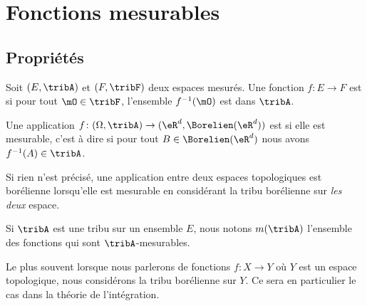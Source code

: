 
\section{Fonctions mesurables}

\subsection{Propriétés}

\begin{definition} \label{DefQKjDSeC}
    Soit \( (E,\tribA)\) et \( (F,\tribF)\) deux espaces mesurés. Une fonction \( f\colon E\to F\) est  si pour tout \( \mO\in \tribF\), l'ensemble \( f^{-1}(\mO)\) est dans \( \tribA\).
\end{definition}

\begin{definition}     \label{DefHHIBooNrpQjs}
    Une application \( f\colon (\Omega,\tribA)\to (\eR^d,\Borelien(\eR^d))\) est  si elle est mesurable, c'est à dire si pour tout \( B\in\Borelien(\eR^d)\) nous avons \( f^{-1}(A)\in\tribA\).

    Si rien n'est précisé, une application entre deux espaces topologiques est borélienne lorsqu'elle est mesurable en considérant la tribu borélienne sur \emph{les deux} espace.
\end{definition}
Si \( \tribA\) est une tribu sur un ensemble \( E\), nous notons \( m(\tribA)\) l'ensemble des fonctions qui sont \( \tribA\)-mesurables.

Le plus souvent lorsque nous parlerons de fonctions \( f\colon X\to Y\) où \( Y\) est un espace topologique, nous considérons la tribu borélienne sur \( Y\). Ce sera en particulier le cas dans la théorie de l'intégration.

